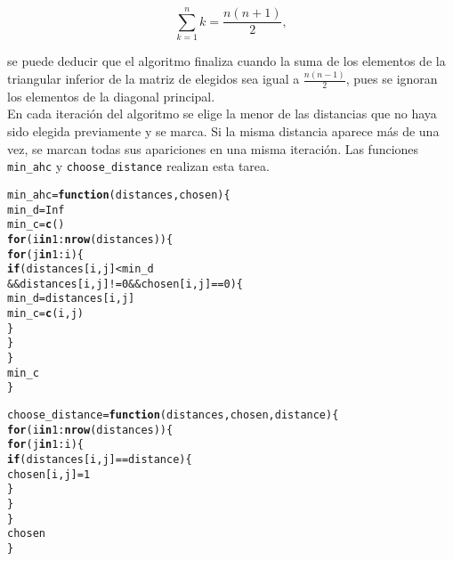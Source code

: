 \documentclass[12pt]{report}\usepackage[]{graphicx}\usepackage[dvipsnames]{xcolor}
\makeatletter
\newcommand{\hlnum}[1]{\textcolor[rgb]{0.686,0.059,0.569}{#1}}%
\newcommand{\hlopt}[1]{\textcolor[rgb]{0,0,0}{#1}}%
\newcommand{\hlstd}[1]{\textcolor[rgb]{0.345,0.345,0.345}{#1}}%
\newcommand{\hlkwa}[1]{\textcolor[rgb]{0.161,0.373,0.58}{\textbf{#1}}}%
\newcommand{\hlkwb}[1]{\textcolor[rgb]{0.69,0.353,0.396}{#1}}%
\newcommand{\hlkwc}[1]{\textcolor[rgb]{0.333,0.667,0.333}{#1}}%
\newcommand{\hlkwd}[1]{\textcolor[rgb]{0.737,0.353,0.396}{\textbf{#1}}}%
\newenvironment{kframe}{%
 \def\at@end@of@kframe{}%
 \ifinner\ifhmode%
  \def\at@end@of@kframe{\end{minipage}}%
  \begin{minipage}{\columnwidth}%
 \fi\fi%
 \def\FrameCommand##1{\hskip\@totalleftmargin \hskip-\fboxsep
 \colorbox{shadecolor}{##1}\hskip-\fboxsep
     \hskip-\linewidth \hskip-\@totalleftmargin \hskip\columnwidth}%
 \MakeFramed {\advance\hsize-\width
   \@totalleftmargin\z@ \linewidth\hsize
   \@setminipage}}%
 {\par\unskip\endMakeFramed%
 \at@end@of@kframe}
\newenvironment{knitrout}{}{} %
\makeatother
\begin{document}
		 		$$
		 		\sum_{k=1}^n k = \frac{n(n+1)}{2}, 
		 		$$ 
		 		
		 		\noindent se puede deducir que el algoritmo finaliza cuando la suma de los elementos de la triangular inferior de la matriz de elegidos sea igual a $\frac{n(n-1)}{2}$, pues se ignoran los elementos de la diagonal principal. \\
		 		
		 		En cada iteración del algoritmo se elige la menor de las distancias que no haya sido elegida previamente y se marca. Si la misma distancia aparece más de una vez, se marcan todas sus apariciones en una misma iteración. Las funciones \texttt{min\_ahc} y \texttt{choose\_distance} realizan esta tarea. 
		 		
\begin{knitrout}
\color{fgcolor}\begin{kframe}
\begin{alltt}
\hlstd{min_ahc} \hlkwb{=} \hlkwa{function}\hlstd{(}\hlkwc{distances}\hlstd{,} \hlkwc{chosen}\hlstd{) \{}
        \hlstd{min_d} \hlkwb{=} \hlnum{Inf}
        \hlstd{min_c} \hlkwb{=} \hlkwd{c}\hlstd{()}
        \hlkwa{for}\hlstd{(i} \hlkwa{in} \hlnum{1}\hlopt{:}\hlkwd{nrow}\hlstd{(distances)) \{}
                \hlkwa{for}\hlstd{(j} \hlkwa{in} \hlnum{1}\hlopt{:}\hlstd{i) \{}
                        \hlkwa{if} \hlstd{(distances[i, j]} \hlopt{<} \hlstd{min_d}
                         \hlopt{&&} \hlstd{distances[i, j]} \hlopt{!=} \hlnum{0} \hlopt{&&} \hlstd{chosen[i, j]} \hlopt{==} \hlnum{0}\hlstd{) \{}
                                \hlstd{min_d} \hlkwb{=} \hlstd{distances[i, j]}
                                \hlstd{min_c} \hlkwb{=} \hlkwd{c}\hlstd{(i, j)}
                        \hlstd{\}}
                \hlstd{\}}
        \hlstd{\}}
        \hlstd{min_c}
\hlstd{\}}

\hlstd{choose_distance} \hlkwb{=} \hlkwa{function}\hlstd{(}\hlkwc{distances}\hlstd{,} \hlkwc{chosen}\hlstd{,} \hlkwc{distance}\hlstd{)\{}
        \hlkwa{for}\hlstd{(i} \hlkwa{in} \hlnum{1}\hlopt{:}\hlkwd{nrow}\hlstd{(distances)) \{}
                \hlkwa{for}\hlstd{(j} \hlkwa{in} \hlnum{1}\hlopt{:}\hlstd{i) \{}
                        \hlkwa{if} \hlstd{(distances[i, j]} \hlopt{==} \hlstd{distance) \{}
                                \hlstd{chosen[i, j]} \hlkwb{=} \hlnum{1}
                        \hlstd{\}}
                \hlstd{\}}
        \hlstd{\}}
        \hlstd{chosen}
\hlstd{\}}
\end{alltt}
\end{kframe}
\end{knitrout}
		 		
\end{document}
